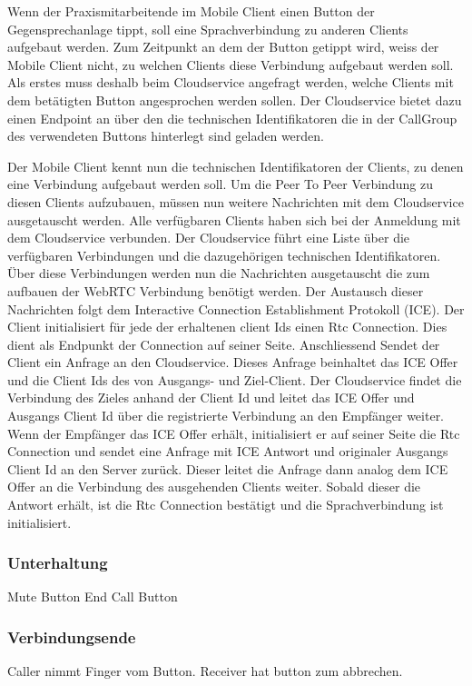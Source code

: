 Wenn der Praxismitarbeitende im Mobile Client einen Button der Gegensprechanlage tippt, soll eine Sprachverbindung zu anderen Clients aufgebaut werden.
Zum Zeitpunkt an dem der Button getippt wird, weiss der Mobile Client nicht, zu welchen Clients diese Verbindung aufgebaut werden soll.
Als erstes muss deshalb beim Cloudservice angefragt werden, welche Clients mit dem betätigten Button angesprochen werden sollen.
Der Cloudservice bietet dazu einen Endpoint an über den die technischen Identifikatoren die in der CallGroup des verwendeten Buttons hinterlegt sind geladen werden.

Der Mobile Client kennt nun die technischen Identifikatoren der Clients, zu denen eine Verbindung aufgebaut werden soll.
Um die Peer To Peer Verbindung zu diesen Clients aufzubauen, müssen nun weitere Nachrichten mit dem Cloudservice ausgetauscht werden.
Alle verfügbaren Clients haben sich bei der Anmeldung mit dem Cloudservice verbunden.
Der Cloudservice führt eine Liste über die verfügbaren Verbindungen und die dazugehörigen technischen Identifikatoren.
Über diese Verbindungen werden nun die Nachrichten ausgetauscht die zum aufbauen der WebRTC Verbindung benötigt werden.
Der Austausch dieser Nachrichten folgt dem Interactive Connection Establishment Protokoll (ICE).
Der Client initialisiert für jede der erhaltenen client Ids einen Rtc Connection.
Dies dient als Endpunkt der Connection auf seiner Seite.
Anschliessend Sendet der Client ein Anfrage an den Cloudservice.
Dieses Anfrage beinhaltet das ICE Offer und die Client Ids des von Ausgangs- und Ziel-Client.
Der Cloudservice findet die Verbindung des Zieles anhand der Client Id und leitet das ICE Offer und Ausgangs Client Id über die registrierte Verbindung an den Empfänger weiter.
Wenn der Empfänger das ICE Offer erhält, initialisiert er auf seiner Seite die Rtc Connection und sendet eine Anfrage mit ICE Antwort und originaler Ausgangs Client Id an den Server zurück.
Dieser leitet die Anfrage dann analog dem ICE Offer an die Verbindung des ausgehenden Clients weiter.
Sobald dieser die Antwort erhält, ist die Rtc Connection bestätigt und die Sprachverbindung ist initialisiert.

\clearpage


\subsubsection*{Unterhaltung}

Mute Button
End Call Button


\subsubsection*{Verbindungsende}

Caller nimmt Finger vom Button.
Receiver hat button zum abbrechen.

\clearpage
